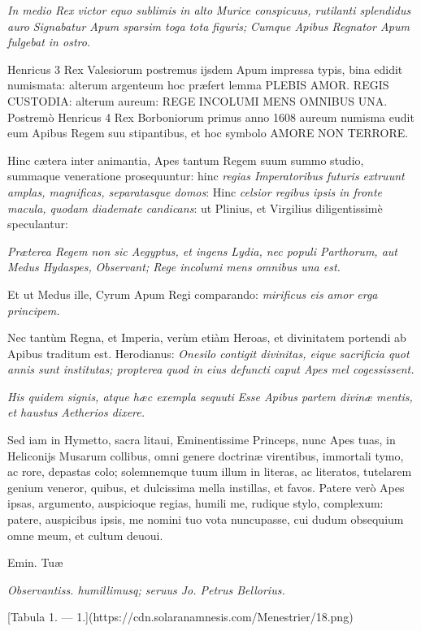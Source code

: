 \documentclass[a4paper, 11pt, oneside, polutonikogreek, latin]{article}
\begin{document}
\emph{In medio Rex victor equo sublimis in alto}
\emph{Murice conspicuus, rutilanti splendidus auro}
\emph{Signabatur Apum sparsim toga tota figuris;}
\emph{Cumque Apibus Regnator Apum fulgebat in ostro.}

Henricus 3 Rex Valesiorum postremus ijsdem Apum impressa typis, bina edidit numismata: alterum argenteum hoc præfert lemma PLEBIS AMOR. REGIS CUSTODIA: alterum aureum: REGE INCOLUMI MENS OMNIBUS UNA. Postremò Henricus 4 Rex Borboniorum primus anno 1608 aureum numisma eudit eum Apibus Regem suu stipantibus, et hoc symbolo AMORE NON TERRORE.

Hinc cætera inter animantia, Apes tantum Regem suum summo studio, summaque veneratione prosequuntur: hinc \emph{regias Imperatoribus futuris extruunt amplas, magnificas, separatasque domos}: Hinc \emph{celsior regibus ipsis in fronte macula, quodam diademate candicans}: ut Plinius, et Virgilius diligentissimè speculantur:

\emph{Præterea Regem non sic Aegyptus, et ingens}
\emph{Lydia, nec populi Parthorum, aut Medus Hydaspes,}
\emph{Observant; Rege incolumi mens omnibus una est.}

Et ut Medus ille, Cyrum Apum Regi comparando: \emph{mirificus eis amor erga principem.}

Nec tantùm Regna, et Imperia, verùm etiàm Heroas, et divinitatem portendi ab Apibus traditum est. Herodianus: \emph{Onesilo contigit divinitas, eique sacrificia quot annis sunt institutas; propterea quod in eius defuncti caput Apes mel cogessissent.}

\emph{His quidem signis, atque hæc exempla sequuti}
\emph{Esse Apibus partem divinæ mentis, et haustus}
\emph{Aetherios dixere.}

Sed iam in Hymetto, sacra litaui, Eminentissime Princeps, nunc Apes tuas, in Heliconijs Musarum collibus, omni genere doctrinæ virentibus, immortali tymo, ac rore, depastas colo; solemnemque tuum illum in literas, ac literatos, tutelarem genium veneror, quibus, et dulcissima mella instillas, et favos. Patere verò Apes ipsas, argumento, auspicioque regias, humili me, rudique stylo, complexum: patere, auspicibus ipsis, me nomini tuo vota nuncupasse, cui dudum obsequium omne meum, et cultum deuoui.

Emin. Tuæ

\emph{Observantiss. humillimusq; seruus Jo. Petrus Bellorius.}

[Tabula 1. --- 1.](https://cdn.solaranamnesis.com/Menestrier/18.png)
\end{document}
